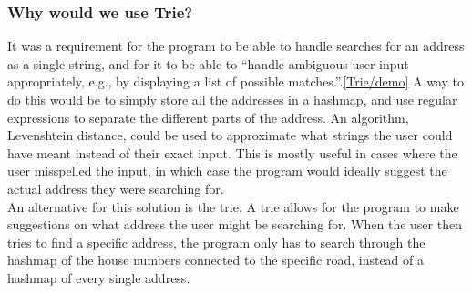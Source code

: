 \subsubsection{Why would we use Trie?}
It was a requirement for the program to be able to handle searches for an address as a single string, and for it to be able to “handle ambiguous user input appropriately, e.g., by displaying a list of possible matches.”.\ref{Trie/demo} A way to do this would be to simply store all the addresses in a hashmap, and use regular expressions to separate the different parts of the address. An algorithm, Levenshtein distance, could be used to approximate what strings the user could have meant instead of their exact input. This is mostly useful in cases where the user misspelled the input, in which case the program would ideally suggest the actual address they were searching for.\\
An alternative for this solution is the trie. A trie allows for the program to make suggestions on what address the user might be searching for. When the user then tries to find a specific address, the program only has to search through the hashmap of the house numbers connected to the specific road, instead of a 
hashmap of every single address.
